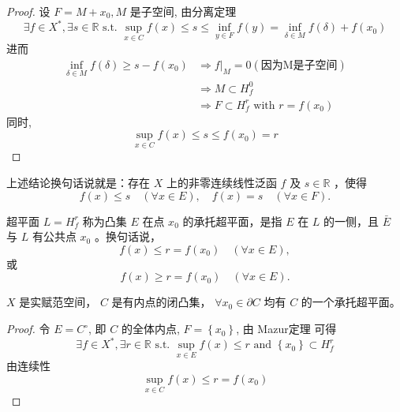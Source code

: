 \documentclass[lang=cn,newtx,10pt,scheme=chinese,thmcnt=chapter]{elegantbook}
\begin{document}
\begin{proof}
设 $F=M+x_0, M$ 是子空间, 由分离定理
\begin{equation*}
\exists f \in X^*, \exists s \in \mathbb{R} \text { s.t. } \sup _{x \in C} f(x) \leqslant s \leqslant \inf _{y \in F} f(y)=\inf _{\delta \in M} f(\delta)+f\left(x_0\right)
\end{equation*}
进而
\begin{equation*}
\begin{aligned}
\inf _{\delta \in M} f(\delta) \geqslant s-f\left(x_0\right) & \Rightarrow f|_M=0 (\text{因为M是子空间})\\
& \Rightarrow M \subset H_f^0 \\
& \Rightarrow F \subset H_f^r \text { with } r=f\left(x_0\right)
\end{aligned}
\end{equation*}
同时,
\begin{equation*}
\sup _{x \in C} f(x) \leqslant s \leqslant f\left(x_0\right)=r
\end{equation*}
\end{proof}
\begin{note}
上述结论换句话说就是：存在 $X$ 上的非零连续线性泛函 $f$ 及 $s \in \mathbb{R}$ ，使得
\begin{equation*}
f(x) \leqslant s \quad(\forall x \in E), \quad f(x)=s \quad(\forall x \in F) .
\end{equation*}
\end{note}

\begin{definition}
超平面 $L=H_f^r$ 称为凸集 $E$ 在点 $x_0$ 的承托超平面，是指 $E$ 在 $L$ 的一侧，且 $\bar{E}$ 与 $L$ 有公共点 $x_0$ 。换句话说，
\begin{equation*}
f(x) \leqslant r=f\left(x_0\right) \quad(\forall x \in E),
\end{equation*}
或
\begin{equation*}
f(x) \geqslant r=f\left(x_0\right) \quad(\forall x \in E) .
\end{equation*}
\end{definition}
\begin{theorem}
$X$ 是实赋范空间， $C$ 是有内点的闭凸集， $\forall x_0 \in \partial C$ 均有 $C$ 的一个承托超平面。
\end{theorem}
\begin{proof}
令 $E=C^{\circ}$, 即 $C$ 的全体内点, $F=\left\{x_0\right\}$, 由 Mazur定理 可得
\begin{equation*}
\exists f \in X^*, \exists r \in \mathbb{R} \text { s.t. } \sup _{x \in E} f(x) \leqslant r \text { and }\left\{x_0\right\} \subset H_f^r
\end{equation*}
由连续性
\begin{equation*}
\sup _{x \in C} f(x) \leqslant r=f\left(x_0\right)
\end{equation*}
\end{proof}
\end{document}
